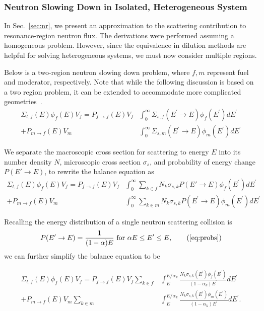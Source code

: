 \documentclass[10pt]{article}
\begin{document}
\subsubsection{Neutron Slowing Down in Isolated, Heterogeneous System}\label{sec:hetero}
In Sec.~\ref{sec:nr}, we present an approximation to the scattering contribution to resonance-region neutron flux. The derivations were performed assuming a homogeneous problem. However, since the equivalence in dilution methods are helpful for solving heterogeneous systems, we must now consider multiple regions. \par
Below is a two-region neutron slowing down problem, where $f,m$ represent fuel and moderator, respectively. Note that while the following discussion is based on a two region problem, it can be extended to accommodate more complicated geometries~\cite{ch9}.
\begin{align}\Sigma_{t,f}(E)\phi_{f}(E)V_{f}=P_{f\rightarrow f}(E)V_{f}&\int_{0}^{\infty}\Sigma_{s,f}\left(E^{\prime}\rightarrow E\right)\phi_{f}\left(E^{\prime}\right)dE^{\prime}\\ + P_{m\rightarrow f}(E)V_{m}&\int_{0}^{\infty}\Sigma_{s,m}\left(E^{\prime}\rightarrow E\right)\phi_{m}\left(E^{\prime}\right)dE^{\prime}\end{align}

We separate the macroscopic cross section for scattering to energy $E$ into its number density $N$, microscopic cross section $\sigma_s$, and probability of energy change $P(E'\rightarrow E)$, to rewrite the balance equation as 
\begin{align}\Sigma_{t,f}(E)\phi_{f}(E)V_{f}=P_{f\rightarrow f}(E)V_{f}&\int_{0}^{\infty}\sum\limits_{k\in f}N_k\sigma_{s,k}P(E'\rightarrow E)\phi_{f}\left(E^{\prime}\right)dE^{\prime}\\ + P_{m\rightarrow f}(E)V_{m}&\int_{0}^{\infty}\sum\limits_{k\in m}N_k\sigma_{s,k}P\left(E^{\prime}\rightarrow E\right)\phi_{m}\left(E^{\prime}\right)dE^{\prime}\end{align}

Recalling the energy distribution of a single neutron scattering collision is 
\begin{equation}P(E'\rightarrow E)=\frac{1}{(1-\alpha)E}~\mbox{for }\alpha E\leq E'\leq E,\tag{\ref{eq:probs}}\end{equation}
we can further simplify the balance equation to be

\begin{align}\Sigma_{t,f}(E)\phi_{f}(E)V_{f} = P_{f\rightarrow f}(E)V_{f}\sum\limits_{k\in f}&\int_{E}^{E/\alpha_{k}}\frac{N_{k}\sigma_{s,k}\left(E^{\prime}\right)\phi_{f}\left(E^{\prime}\right)}{\left(1-\alpha_{k}\right)E^{\prime}}dE^{\prime}  \\
+ P_{m\rightarrow f}(E)V_{m}\sum\limits_{k\in m}&\int_{E}^{E/\alpha_{k}}\frac{N_{k}\sigma_{s,k}\left(E^{\prime}\right)\phi_{m}\left(E^{\prime}\right)}{\left(1-\alpha_{k}\right)E^{\prime}}dE^{\prime}.\label{eq:hetero-balance}\end{align}
\end{document}
